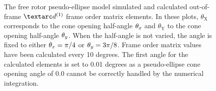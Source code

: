 \begin{figure}
\begin{tabular}{@{}cc@{}}
  \end{tabular}
  \caption[Free rotor pseudo-ellipse simulated and calculated out-of-frame $\FOone$ elements.]{
    The free rotor pseudo-ellipse model simulated and calculated out-of-frame $\FOone$ frame order matrix elements.
    In these plots, $\theta_\textrm{X}$ corresponds to the cone opening half-angle $\theta_x$ and $\theta_\textrm{Y}$ to the cone opening half-angle $\theta_y$.
    When the half-angle is not varied, the angle is fixed to either $\theta_x = \pi/4$ or $\theta_y = 3\pi/8$.
    Frame order matrix values have been calculated every 10 degrees.
    The first angle for the calculated elements is set to 0.01 degrees as a pseudo-ellipse cone opening angle of 0.0 cannot be correctly handled by the numerical integration.
  }
  \label{fig: simulated and calculated out-of-frame 1st degree pseudo-ellipse, free rotor frame order}
\end{figure}

